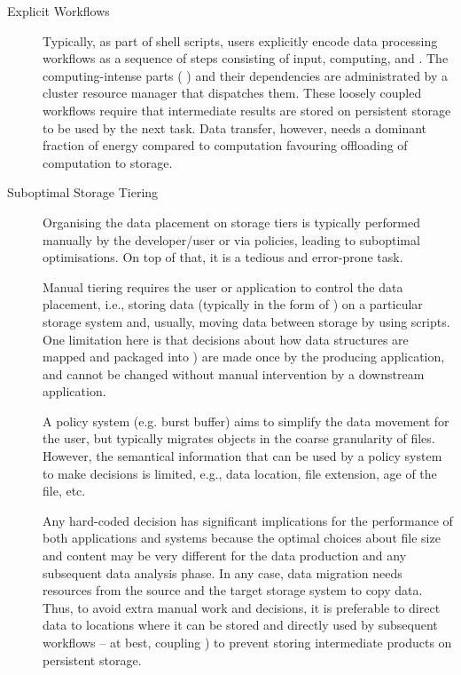 \documentclass[a4paper]{article}
\begin{document}
\begin{description}
\item[Explicit Workflows]

Typically, as part of shell scripts, users explicitly encode data processing workflows as a sequence of steps consisting of input, computing, and \sout{{\color{blue}{output}}} {\color{cyan}{products}}.
The computing-intense parts ({\color{blue}{jobs}} {\color{cyan}{tasks?}}) and their dependencies are administrated by a cluster resource manager that dispatches them.
These loosely coupled workflows require that intermediate results are stored on persistent storage to be used by the next task.
Data transfer, however, needs a dominant fraction of energy compared to computation favouring offloading of computation to storage.

\item[Suboptimal Storage Tiering]

Organising the data placement on storage tiers is typically performed manually by the developer/user or via policies, leading to suboptimal optimisations. On top of that, it is a tedious and error-prone task.

Manual tiering requires the user or application to control the data placement, i.e., storing data (typically in the form of \sout{{\color{blue}{files}}} {\color{cyan}{datasets}}) on a particular storage system and, usually, moving data between storage by using scripts.
One limitation here is that decisions about how data structures are mapped and packaged into \sout{{\color{blue}{files}}} {\color{cyan}{datasets}}) are made once by the producing application, and cannot be changed without manual intervention by a downstream application.

A policy system (e.g. burst buffer) aims to simplify the data movement for the user, but typically migrates objects in the coarse granularity of files.
However, the semantical information that can be used by a policy system to make decisions is limited, e.g., data location, file extension, age of the file, etc.

Any hard-coded decision has significant implications for the performance of both applications and systems because the optimal choices about file size and content may be very different for the data production and any subsequent data analysis phase.
In any case, data migration needs resources from the source {\color{cyan}{source? the machine?}} and the target storage system to copy data.
Thus, to avoid extra manual work and decisions, it is preferable to direct data to locations where it can be stored and directly used by subsequent workflows -- at best, coupling \sout{{\color{blue}{the data source producing data with a data consumer}}} {\color{cyan}{the data source with the data consumer}}) to prevent storing intermediate products on persistent storage.


\end{description}
\end{document}
